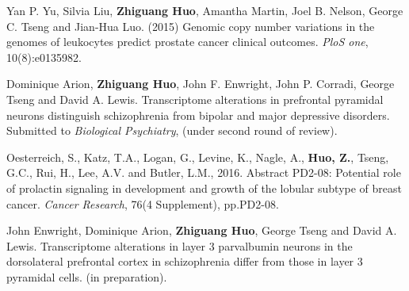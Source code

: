\documentclass[a4paper, 10pt]{article}
\begin{document}
\begin{thebibliography}{9}
Yan P. Yu, Silvia Liu, {\bf Zhiguang Huo}, Amantha Martin, Joel B. Nelson, George C. Tseng and Jian-Hua Luo. (2015) Genomic copy number variations in the genomes of leukocytes predict prostate cancer clinical outcomes. \emph{PloS one}, 10(8):e0135982.

    
Dominique Arion, {\bf Zhiguang Huo}, John F. Enwright, John P. Corradi, George Tseng and David A. Lewis.
Transcriptome alterations in prefrontal pyramidal neurons distinguish schizophrenia from bipolar and major depressive disorders.
Submitted to \emph{Biological Psychiatry}, (under second round of review).



Oesterreich, S., Katz, T.A., Logan, G., Levine, K., Nagle, A., {\bf Huo, Z.}, Tseng, G.C., Rui, H., Lee, A.V. and Butler, L.M., 2016. Abstract PD2-08: Potential role of prolactin signaling in development and growth of the lobular subtype of breast cancer. \emph{Cancer Research}, 76(4 Supplement), pp.PD2-08.

John Enwright,  Dominique Arion, {\bf Zhiguang Huo}, George Tseng and David A. Lewis. 
Transcriptome alterations in layer 3 parvalbumin neurons in the dorsolateral prefrontal cortex in schizophrenia differ from those in layer 3 pyramidal cells.
(in preparation).



\end{thebibliography}
\end{document}
